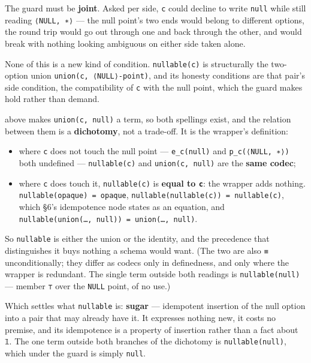 The guard must be \textbf{joint}. Asked per side, \texttt{c} could decline to write \texttt{null} while still reading
\texttt{⟨NULL,\ ∗⟩} — the null point's two ends would belong to different options, the round trip would go
out through one and back through the other, and  would break with nothing looking ambiguous
on either side taken alone.

None of this is a new kind of condition. \texttt{nullable(c)} is structurally the two-option union
\texttt{union(c,\ ⟨NULL⟩-point)}, and its honesty conditions are that pair's side condition,
the compatibility of \texttt{c} with the null point, which the guard makes hold rather than
demand.

 above makes \texttt{union(c,\ null)} a term, so both spellings exist, and the relation between
them is a \textbf{dichotomy}, not a trade-off. It is the wrapper's definition:

\begin{itemize}
\tightlist
\item
  where \texttt{c} does not touch the null point — \texttt{e\_c(null)} and \texttt{p\_c(⟨NULL,\ ∗⟩)} both undefined —
  \texttt{nullable(c)} and \texttt{union(c,\ null)} are the \textbf{same codec};
\item
  where \texttt{c} does touch it, \texttt{nullable(c)} is \textbf{equal to \texttt{c}}: the wrapper adds
  nothing. \texttt{nullable(opaque)\ =\ opaque}, \texttt{nullable(nullable(c))\ =\ nullable(c)}, which §6's
  idempotence node states as an equation, and \texttt{nullable(union(…,\ null))\ =\ union(…,\ null)}.
\end{itemize}

So \texttt{nullable} is either the union or the identity, and the precedence that distinguishes it buys
nothing a schema would want. (The two are also \texttt{≡} unconditionally; they
differ as codecs only in definedness, and only where the wrapper is redundant. The single term
outside both readings is \texttt{nullable(null)} — member \texttt{⊤} over the \texttt{NULL} point, of no use.)

Which settles what \texttt{nullable} is: \textbf{sugar} — idempotent insertion of the null option into a pair
that may already have it. It expresses nothing new, it costs no premise, and its idempotence is a
property of insertion rather than a fact about \texttt{𝟙}. The one term outside both branches of the
dichotomy is \texttt{nullable(null)}, which under the guard is simply \texttt{null}.

